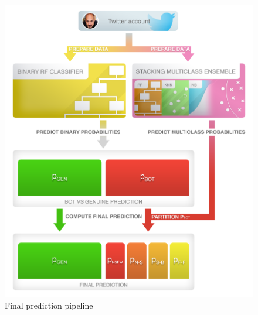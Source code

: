 \begin{figure}
	\begin{center}
		\includegraphics[width=\columnwidth]{chapter5/figure/pred_pipeline.png}\par 
	\end{center}
	\caption{Final prediction pipeline}
	\label{fig:prediction_pipeline}
\end{figure}